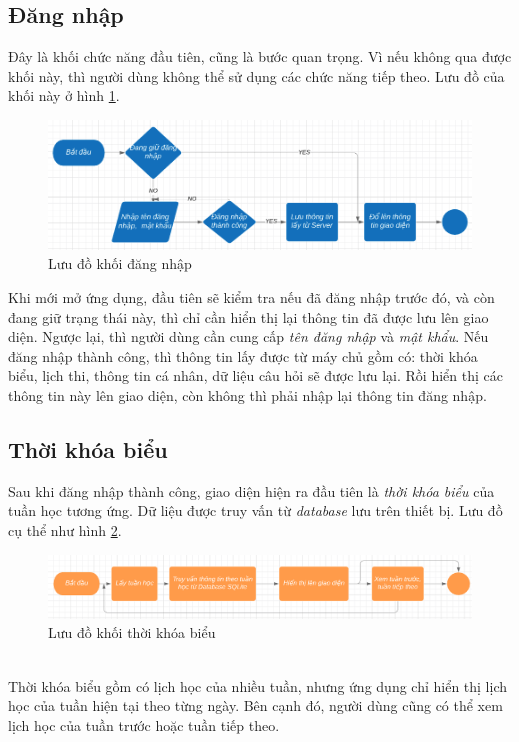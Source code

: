 \documentclass[a4paper]{article}
\begin{document}
\subsection{Đăng nhập}
\hspace*{.5 cm}Đây là khối chức năng đầu tiên, cũng là bước quan trọng. Vì nếu không qua được khối này, thì người dùng không thể sử dụng các chức năng tiếp theo. Lưu đồ của khối này ở hình \ref{fig:login}. \\
\begin{figure}[H]
    \centering
    \includegraphics[scale=.4]{loginflow.png}
    \caption{Lưu đồ khối đăng nhập}
    \label{fig:login}
\end{figure}
\hspace*{.5 cm}Khi mới mở ứng dụng, đầu tiên sẽ kiểm tra nếu đã đăng nhập trước đó, và còn đang giữ trạng thái này, thì chỉ cần hiển thị lại thông tin đã được lưu lên giao diện. Ngược lại, thì người dùng cần cung cấp \textit{tên đăng nhập} và \textit{mật khẩu}. Nếu đăng nhập thành công, thì thông tin lấy được từ máy chủ gồm có: thời khóa biểu, lịch thi, thông tin cá nhân, dữ liệu câu hỏi sẽ được lưu lại. Rồi hiển thị các thông tin này lên giao diện, còn không thì phải nhập lại thông tin đăng nhập.
\subsection {Thời khóa biểu}
\hspace*{0.5 cm}Sau khi đăng nhập thành công, giao diện hiện ra đầu tiên là \textit{thời khóa biểu} của tuần học tương ứng. Dữ liệu được truy vấn từ \textit{database} lưu trên thiết bị. Lưu đồ cụ thể như hình \ref{fig:scheduler}.\\
\begin{figure}[h!]
    \centering
    \includegraphics[scale=.4]{schedulerflow.png}
    \caption{Lưu đồ khối thời khóa biểu}
    \label{fig:scheduler}
\end{figure}\\
\hspace*{0.5 cm}Thời khóa biểu gồm có lịch học của nhiều tuần, nhưng ứng dụng chỉ hiển thị lịch học của tuần hiện tại theo từng ngày. Bên cạnh đó, người dùng cũng có thể xem lịch học của tuần trước hoặc tuần tiếp theo.
\end{document}
